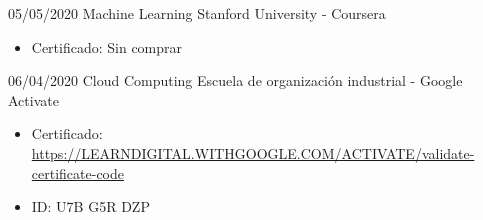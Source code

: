 \begin{entrylist}
{\begin{itemize}
		    \end{itemize}
		}
	\entry
		{05/05/2020}
		{Machine Learning}
		{Stanford University - Coursera}
		{
		    \vspace{-5mm}
		    \begin{itemize}
		        \setlength\itemsep{0pt}
		        \item Certificado: Sin comprar
		    \end{itemize}
		}
	\entry
		{06/04/2020}
		{Cloud Computing}
		{Escuela de organización industrial - Google Activate}
		{
		    \vspace{-5mm}
		    \begin{itemize}
		        \setlength\itemsep{0pt}
		        \item Certificado: {\href{https://LEARNDIGITAL.WITHGOOGLE.COM/ACTIVATE/validate-certificate-code}{https://LEARNDIGITAL.WITHGOOGLE.COM/ACTIVATE/validate-certificate-code}}
		        \item ID: U7B G5R DZP
		    \end{itemize}
		}
\end{entrylist}